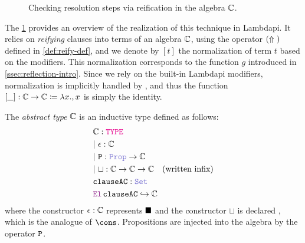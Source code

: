\begin{figure}[t]
  \centering
  \caption{Checking resolution steps via reification in the algebra $\bb{C}$.}
  \label{fig:reflective-process}
\end{figure}

The \cref{fig:reflective-process} provides an overview of the realization of this technique in Lambdapi.
It relies on \emph{reifying} clauses into terms of an algebra $\bb{C}$, using the operator $\reify{}$ defined in \cref{def:reify-def},
and we denote by $[t]$ the normalization of term $t$ based on the  modifiers.
This normalization corresponds to the function $g$ introduced in \cref{ssec:reflection-intro}.
Since we rely on the built-in Lambdapi modifiers, normalization is implicitly handled by \lpm, and thus the function $[\_]: \bb{C} \rightarrow \bb{C} \coloneq \lambda x., x$ is simply the identity.

\begin{definition}
The \emph{abstract type} $\bb{C}$ is an inductive type defined as follows:
\begin{align*}
&\bb{C} : \type \\
&|~\eps: \bb{C} \\
&|~\kw{P}: \prop \ra \bb{C} \\
&|~\sqcup: \bb{C} \ra \bb{C} \ra \bb{C} \quad \text{(written infix)} \\
&\kw{clauseAC} : \set \\
&\el\, \kw{clauseAC} \re \bb{C} \\
\end{align*}
where the constructor $\eps: \bb{C}$ represents $\nil$ and the constructor $\sqcup$ is declared , which is the analogue of $\cons$.
Propositions are injected into the algebra by the operator $\tt{P}$.
\end{definition}

